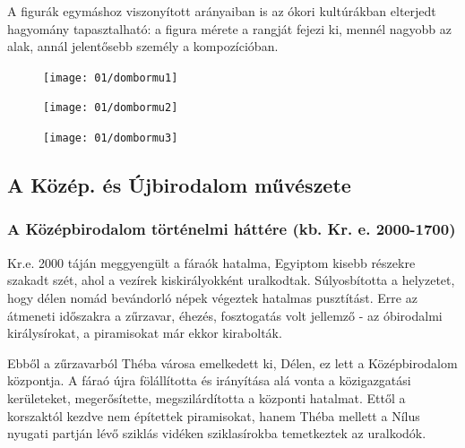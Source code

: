 A figurák egymáshoz viszonyított arányaiban is az ókori kultúrákban elterjedt hagyomány tapasztalható: a figura mérete a rangját fejezi ki, mennél nagyobb az alak, annál jelentősebb személy a kompozícióban.

\begin{figure}[H]
	\begin{tcolorbox}[enhanced,colframe=gray!50!white,
		colbacktitle=white!15!white,
		coltitle=gray!50!black,
		borderline={0.5mm}{0mm}{gray!15!white},
		borderline={0.5mm}{0mm}{gray!50!white,dashed},
		attach boxed title to top center={yshift=-2mm},
		boxed title style={boxrule=0.4pt},
		title=Domborművek hivatalnokok masztabáiból]{
		\begin{minipage}{0.33\textwidth}
					\texttt{[image: 01/dombormu1]}
		\end{minipage}
		\hfill
		\begin{minipage}{0.25\textwidth}
					\texttt{[image: 01/dombormu2]}
		\end{minipage}	
		\hfill
		\begin{minipage}{0.36\textwidth}
			\texttt{[image: 01/dombormu3]}
		\end{minipage}}
	\end{tcolorbox}
\end{figure}

\cleardoublepage

\subsection*{A Közép. és Újbirodalom művészete}

\subsubsection*{A Középbirodalom történelmi háttére (kb. Kr. e. 2000-1700)}

Kr.e. 2000 táján meggyengült a fáraók hatalma, Egyiptom kisebb részekre szakadt szét, ahol a vezírek kiskirályokként uralkodtak. Súlyosbította a helyzetet, hogy délen nomád bevándorló népek végeztek hatalmas pusztítást. Erre az átmeneti időszakra a zűrzavar, éhezés, fosztogatás volt jellemző - az óbirodalmi királysírokat, a piramisokat már ekkor kirabolták.

Ebből a zűrzavarból Théba városa emelkedett ki, Délen, ez lett a Középbirodalom központja. A fáraó újra fölállította és irányítása alá vonta a közigazgatási kerületeket, megerősítette, megszilárdította a központi hatalmat. Ettől a korszaktól kezdve nem építettek piramisokat, hanem Théba mellett a Nílus nyugati partján lévő sziklás vidéken sziklasírokba temetkeztek az uralkodók.


